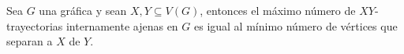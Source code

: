 
\newpage

\begin{teorema}
    \label{teo:menger}
    Sea $G$ una gr\'afica y sean $X, Y \subseteq V(G)$, entonces el m\'aximo
    n\'umero de $XY$-trayectorias internamente ajenas en $G$ es igual al
    m\'inimo n\'umero de v\'ertices que separan a $X$ de $Y$.
\end{teorema}

